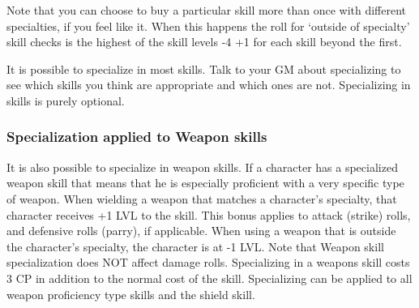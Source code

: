 \documentclass[twoside]{book}
\begin{document}
   Note that you can choose to buy a particular skill
                 more than once with different specialties, if you feel
                 like it. When this happens the roll for `outside
                 of specialty' skill checks is the highest of the
                 skill levels -4 +1 for each skill beyond the first.
                 
  

  

   It is possible to specialize in most skills. Talk
                 to your GM about specializing to see which skills you
                 think are appropriate and which ones are not.  Specializing in skills is purely optional. 
    

\subsubsection{Specialization applied to Weapon skills}
     It is also possible to specialize in weapon
                 skills. If a character has a specialized weapon skill
                 that means that he is especially proficient with a very
                 specific type of weapon. When wielding a weapon that
                 matches a character's specialty, that character
                 receives +1 LVL to the skill. This bonus applies to
                 attack (strike) rolls, and defensive rolls (parry), if
                 applicable. When using a weapon that is outside the
                 character's specialty, the character is at -1 LVL.
                 Note that Weapon skill specialization does NOT affect
                 damage rolls.  Specializing in a weapons skill costs 3 CP in
                 addition to the normal cost of the skill. Specializing
                 can be applied to all weapon proficiency type skills and
                 the shield skill. 
  
\end{document}
